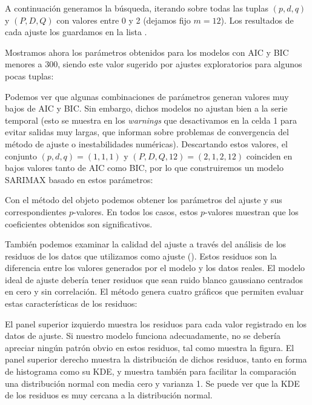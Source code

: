 A continuación generamos la búsqueda, iterando sobre todas las tuplas $(p, d, q)$ y $(P, D, Q)$ con valores entre 0 y 2 (dejamos fijo $m = 12$). Los resultados de cada ajuste los guardamos en la lista . 

Mostramos ahora los parámetros obtenidos para los modelos con AIC y BIC menores a 300, siendo este valor sugerido por ajustes exploratorios para algunos pocas tuplas:


Podemos ver que algunas combinaciones de parámetros generan valores muy bajos de AIC y BIC. Sin embargo, dichos modelos no ajustan bien a la serie temporal (esto se muestra en los \textit{warnings} que desactivamos en la celda 1 para evitar salidas muy largas, que informan sobre problemas de convergencia del método de ajuste o inestabilidades numéricas). Descartando estos valores, el conjunto $(p, d, q) = (1, 1, 1)$ y $(P, D, Q, 12) = (2, 1, 2, 12)$ coinciden en bajos valores tanto de AIC como BIC, por lo que construiremos un modelo SARIMAX basado en estos parámetros:

Con el método  del objeto  podemos obtener los parámetros del ajuste y sus correspondientes $p$-valores. En todos los casos, estos $p$-valores muestran que los coeficientes obtenidos son significativos. 

También podemos examinar la calidad del ajuste a través del análisis de los residuos de los datos que utilizamos como ajuste (). Estos residuos son la diferencia entre los valores generados por el modelo y los datos reales. El modelo ideal de ajuste debería tener residuos que sean ruido blanco gaussiano centrados en cero y sin correlación. El método  genera cuatro gráficos que permiten evaluar estas características de los residuos:

El panel superior izquierdo muestra los residuos para cada valor registrado en los datos de ajuste. Si nuestro modelo funciona adecuadamente, no se debería apreciar ningún patrón obvio en estos residuos, tal como muestra la figura. El panel superior derecho muestra la distribución de dichos residuos, tanto en forma de histograma como su KDE, y muestra también para facilitar la comparación una distribución normal con media cero y varianza 1. Se puede ver que la KDE de los residuos es muy cercana a la distribución normal.

